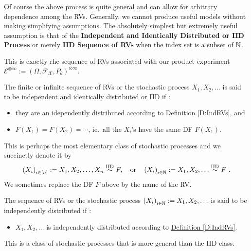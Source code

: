 Of course the above process is quite general and can allow for arbitrary dependence among the RVs.  
Generally, we cannot produce useful models without making simplifying assumptions. 
The absolutely simplest but extremely useful assumption is that of the {\bf Independent and Identically Distributed or IID Process} or merely {\bf IID Sequence of RVs} when the index set is a subset of $\mathbb{N}$. 

This is exactly rhe sequence of RVs associated with our product experiment $\mathcal{E}^{\otimes \infty} := (\Omega, \mathcal{F}_{\mathcal{X}}, P_{\theta})^{\otimes \infty}$.
    
\begin{definition}
The finite or infinite sequence of RVs or the stochastic process $X_1, X_2,\ldots$ is said to be independent and identically distributed or IID if :
\begin{itemize}
\item they are an idependently distributed according to \hyperref[D:IndRVs]{Definition \ref*{D:IndRVs}}, and
\item $F(X_1) = F(X_2) = \cdots $, ie.~all the $X_i$'s have the same DF $F(X_1)$.
\end{itemize}
This is perhaps the most elementary class of stochastic processes and we succinctly denote it by
\[
\left(X_i\right)_{i \in [n]} := X_1, X_2,\ldots, X_n \overset{{\rm IID}}{\sim} F, \quad \text{or} \quad \left(X_i\right)_{i \in \mathbb{N}} := X_1, X_2,\ldots  \overset{{\rm IID}}{\sim} F \ .
\]
We sometimes replace the DF $F$ above by the name of the RV.
 \end{definition}
 
\begin{definition}
The sequence of RVs or the stochastic process $\left(X_i\right)_{i \in \mathbb{N}} := X_1, X_2,\ldots$ is said to be independently distributed if :
\begin{itemize}
\item $X_1, X_2,\ldots$ is independently distributed according to \hyperref[D:IndRVs]{Definition \ref*{D:IndRVs}}.
\end{itemize}
This is a class of stochastic processes that is more general than the IID class.
\end{definition}

